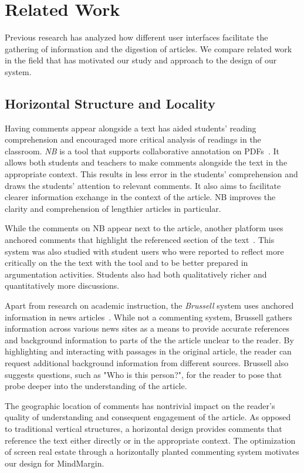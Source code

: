 \section{Related Work}

Previous research has analyzed how different user interfaces facilitate the gathering of information and the digestion of articles. We compare related work in the field that has motivated our study and approach to the design of our system.
 
\subsection{Horizontal Structure and Locality}
Having comments appear alongside a text has aided students’ reading comprehension and encouraged more critical analysis of readings in the classroom. \textit{NB} is a tool that supports collaborative annotation on PDFs~\cite{NB}. It allows both students and teachers to make comments alongside the text in the appropriate context. This results in less error in the students’ comprehension and draws the students’ attention to relevant comments. It also aims to facilitate clearer information exchange in the context of the article. NB improves the clarity and comprehension of lengthier articles in particular. 

While the comments on NB appear next to the article, another platform uses anchored comments that highlight the referenced section of the text~\cite{AnnotationsStudents}. This system was also studied with student users who were reported to reflect more critically on the the text with the tool and to be better prepared in argumentation activities. Students also had both qualitatively richer and quantitatively more discussions.

Apart from research on academic instruction, the \textit{Brussell} system uses anchored information in news articles~\cite{NewsInterfaces}. While not a commenting system, Brussell gathers information across various news sites as a means to provide accurate references and background information to parts of the the article unclear to the reader. By highlighting and interacting with passages in the original article, the reader can request additional background information from different sources. Brussell also suggests questions, such as "Who is this person?", for the reader to pose that probe deeper into the understanding of the article.

The geographic location of comments has nontrivial impact on the reader’s quality of understanding and consequent engagement of the article. As opposed to traditional vertical structures, a horizontal design provides comments that reference the text either directly or in the appropriate context. The optimization of screen real estate through a horizontally planted commenting system motivates our design for MindMargin.


